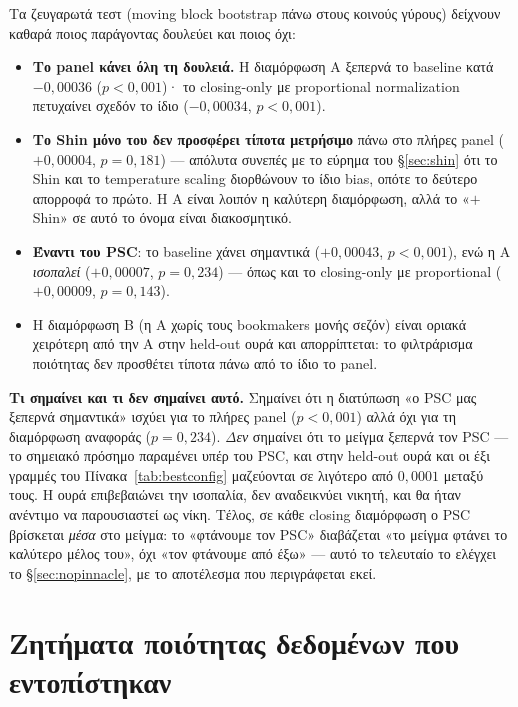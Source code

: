 \documentclass[11pt,a4paper]{article}
\renewcommand{\_}{\oldunderscore\allowbreak}
\begin{document}
Τα ζευγαρωτά τεστ (moving block bootstrap πάνω στους κοινούς γύρους) δείχνουν καθαρά ποιος
παράγοντας δουλεύει και ποιος όχι:

\begin{itemize}
  \item \textbf{Το panel κάνει όλη τη δουλειά.} Η διαμόρφωση A ξεπερνά το baseline κατά
        $-0{,}00036$ ($p<0{,}001$)· το closing-only με proportional normalization πετυχαίνει
        σχεδόν το ίδιο ($-0{,}00034$, $p<0{,}001$).
  \item \textbf{Το Shin μόνο του δεν προσφέρει τίποτα μετρήσιμο} πάνω στο πλήρες panel
        ($+0{,}00004$, $p=0{,}181$) --- απόλυτα συνεπές με το εύρημα του \S\ref{sec:shin}
        ότι το Shin και το temperature scaling διορθώνουν το ίδιο bias, οπότε το δεύτερο
        απορροφά το πρώτο. Η A είναι λοιπόν η καλύτερη διαμόρφωση, αλλά το «$+$Shin» σε αυτό
        το όνομα είναι διακοσμητικό.
  \item \textbf{Έναντι του PSC}: το baseline χάνει σημαντικά ($+0{,}00043$, $p<0{,}001$),
        ενώ η A \emph{ισοπαλεί} ($+0{,}00007$, $p=0{,}234$) --- όπως και το closing-only με
        proportional ($+0{,}00009$, $p=0{,}143$).
  \item Η διαμόρφωση B (η A χωρίς τους bookmakers μονής σεζόν) είναι οριακά χειρότερη από την
        A στην held-out ουρά και απορρίπτεται: το φιλτράρισμα ποιότητας δεν προσθέτει τίποτα
        πάνω από το ίδιο το panel.
\end{itemize}

\textbf{Τι σημαίνει και τι δεν σημαίνει αυτό.} Σημαίνει ότι η διατύπωση «ο PSC μας ξεπερνά
σημαντικά» ισχύει για το πλήρες panel ($p<0{,}001$) αλλά όχι για τη διαμόρφωση αναφοράς
($p=0{,}234$). \emph{Δεν} σημαίνει ότι το μείγμα ξεπερνά τον PSC --- το σημειακό
πρόσημο παραμένει υπέρ του PSC, και στην held-out ουρά και οι έξι γραμμές του
Πίνακα~\ref{tab:bestconfig} μαζεύονται σε λιγότερο από $0{,}0001$ μεταξύ τους. Η ουρά
επιβεβαιώνει την ισοπαλία, δεν αναδεικνύει νικητή, και θα ήταν ανέντιμο να παρουσιαστεί ως
νίκη. Τέλος, σε κάθε closing διαμόρφωση ο PSC βρίσκεται \emph{μέσα} στο μείγμα: το «φτάνουμε
τον PSC» διαβάζεται «το μείγμα φτάνει το καλύτερο μέλος του», όχι «τον φτάνουμε από έξω» ---
αυτό το τελευταίο το ελέγχει το \S\ref{sec:nopinnacle}, με το αποτέλεσμα που περιγράφεται
εκεί.

\section{Ζητήματα ποιότητας δεδομένων που εντοπίστηκαν}
\end{document}
